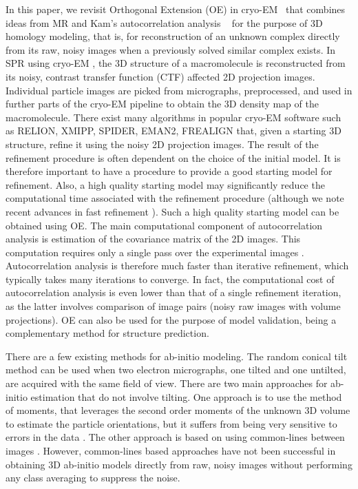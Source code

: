 In this paper, we revisit Orthogonal Extension (OE) in
cryo-EM~\cite{Bhamre2014} that combines ideas from MR and 
Kam's autocorrelation analysis ~\cite{kam1980, Kam1985} for the purpose of 3D homology modeling, that is, for reconstruction of an unknown complex directly from its raw, noisy images when a previously solved similar complex exists. In SPR using cryo-EM \cite{Kuhlbrandt1443, cryoem_rev, 
Henderson}, the 3D structure of a macromolecule is reconstructed from its 
noisy, contrast transfer function (CTF) affected
2D projection images. Individual particle images are picked from micrographs, preprocessed, and used in further parts of the 
cryo-EM pipeline to obtain the 3D density map of the macromolecule. 
There exist many algorithms in popular cryo-EM software such as RELION, XMIPP, 
SPIDER, EMAN2, FREALIGN \cite{relion, xmipp, spider, eman2, frealign} that, 
given a starting 3D structure, refine it using the noisy 2D 
projection images. The result of the refinement procedure is often dependent on 
the choice of the initial model. It is therefore important to have a procedure 
to provide a good starting model for refinement. Also, a 
high quality starting model may significantly reduce the computational time 
associated with the refinement procedure (although we note recent advances in 
fast refinement \cite{Barnett2016,Punjani2017}). Such a high quality starting model can be obtained using OE. The main computational component of autocorrelation analysis is estimation of the covariance matrix of the 2D images. This computation requires only a single pass over the experimental images \cite{Zhao2016,Bhamre2016}. Autocorrelation analysis is therefore much faster than iterative refinement, which typically takes many iterations to converge. In fact,  the computational cost of autocorrelation analysis is even lower than that of a single refinement iteration, as the latter involves comparison of image pairs (noisy raw images with volume projections). OE can also be used for the purpose of model validation, being a complementary method for structure prediction. 

There are a few existing methods for ab-initio modeling. The random conical tilt method \cite{Radermacher2} can be used when 
two electron micrographs, one tilted and one untilted, are acquired with the 
same field of view. There are two main approaches for ab-initio estimation that 
do not involve tilting. One approach is to use the method of moments, that 
leverages the second order moments of the unknown 3D volume to estimate the 
particle orientations, but it suffers from being very sensitive to errors in 
the data \cite{Salzman1990, Goncharov1988}. The other approach is based on 
using common-lines between images \cite{vanHeel1987, Vainshtein, Singer2009, 
Singer2011}. However, common-lines based approaches have not been successful in 
obtaining 3D ab-initio models directly from raw, noisy images without performing 
any class averaging to suppress the noise. 

